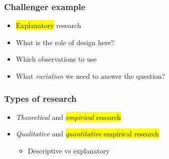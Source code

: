 \documentclass[aspectratio=43]{beamer}
\begin{document}


\begin{frame}
\frametitle{Challenger example}
\centering

\begin{itemize}
  \item \colorbox{yellow}{Explanatory} research
  \item What is the role of design here?
  \item<2-> Which observations to use
  \item<2-> What \textit{variation} we need to answer the question?
\end{itemize}

\end{frame}
  
\begin{frame}
\frametitle{Types of research}
\centering

\begin{itemize}
  \item \textit{Theoretical} and \colorbox{yellow}{\textit{empirical} research}
  \item<2-> \textit{Qualitative} and \colorbox{yellow}{\textit{quantitative} empirical research}
  \begin{itemize}
    \item<3-> Descriptive vs explanatory
  \end{itemize}
\end{itemize}

\end{frame}
\end{document}
